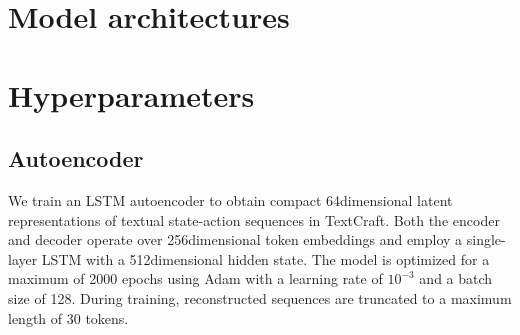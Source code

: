 




\section[appx]{Model architectures}
\label{appx:model_arch}

\section[appx]{Hyperparameters}
\label{appx:hyperparameter}
\subsection{Autoencoder}
We train an LSTM autoencoder to obtain compact 64\text{-}dimensional latent representations of textual state-action sequences in TextCraft. Both the encoder and decoder operate over 256\text{-}dimensional token embeddings and employ a single-layer LSTM with a 512\text{-}dimensional hidden state. The model is optimized for a maximum of 2000 epochs using Adam \citep{KingmaB2015} with a learning rate of $10^{-3}$ and a batch size of 128. During training, reconstructed sequences are truncated to a maximum length of 30 tokens.

